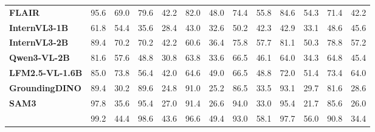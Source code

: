\begin{table}[t]
{\begin{threeparttable}
\begin{tabular}{
l
S S @{\hspace{7pt}}
S S @{\hspace{7pt}}
S S @{\hspace{7pt}}
S S @{\hspace{7pt}}
S S @{\hspace{7pt}}
S S
}
\textbf{FLAIR} & 95.6 & 69.0 & 79.6 & 42.2 & 82.0 & 48.0 & 74.4 & 55.8 & 84.6 & 54.3 & 71.4 & 42.2 \\
\textbf{InternVL3-1B} & 61.8 & 54.4 & 35.6 & 28.4 & 43.0 & 32.6 & 50.2 & 42.3 & 42.9 & 33.1 & 48.6 & 45.6 \\
\textbf{InternVL3-2B} & 89.4 & 70.2 & 70.2 & 42.2 & 60.6 & 36.4 & 75.8 & 57.7 & 81.1 & 50.3 & 78.8 & 57.2 \\
\textbf{Qwen3-VL-2B} & 81.6 & 57.6 & 48.8 & 30.8 & 63.8 & 33.6 & 66.5 & 46.1 & 64.0 & 34.3 & 64.8 & 45.4 \\
\textbf{LFM2.5-VL-1.6B} & 85.0 & 73.8 & 56.4 & 42.0 & 64.6 & 49.0 & 66.5 & 48.8 & 72.0 & 51.4 & 73.4 & 64.0 \\
\textbf{GroundingDINO} & 89.4 & 30.2 & 89.6 & 24.8 & 91.0 & 25.2 & 86.5 & 33.5 & 93.1 & 29.7 & 81.6 & 28.6 \\
\textbf{SAM3} & 97.8 & 35.6 & 95.4 & 27.0 & 91.4 & 26.6 & 94.0 & 33.0 & 95.4 & 21.7 & 85.6 & 26.0 \\
\rowcolor{\methodcolor}\textbf{\model{}} & 99.2 & 44.4 & 98.6 & 43.6 & 96.6 & 49.4 & 93.0 & 58.1 & 97.7 & 56.0 & 90.8 & 34.4 \\

\bottomrule
\end{tabular}
\end{threeparttable}
}
\end{table}